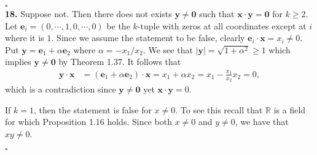 \documentclass[11pt]{article}
\begin{document}
\hfill$\square$\\

\noindent\textbf{18.} Suppose not.
Then there does not exists $\mathbf{y \neq 0}$ such that $\mathbf{x \cdot y = 0}$ for $k \geq 2$.
Let $\mathbf{e}_{i} = (0, \cdots, 1, 0, \cdots, 0)$ be the $k$-tuple with zeros at all coordinates except at $i$ where it is $1$.
Since we assume the statement to be false, clearly $\mathbf{e}_{i} \cdot \mathbf{x} = x_i \neq 0$.
Put $\mathbf{y} = \mathbf{e}_{1} + \alpha \mathbf{e}_{2}$ where $\alpha = -x_1/x_2$. We see that $|\mathbf{y}| = \sqrt{ 1 + \alpha^2 } \geq 1$ which implies $\mathbf{y \neq 0}$ by Theorem 1.37.
It follows that
\begin{align*}
  \mathbf{y \cdot x} & = ( \mathbf{e}_{1} + \alpha\mathbf{e}_{2} ) \cdot \mathbf{x} = x_1 + \alpha x_2 = x_1 - \frac{x_1}{x_2}x_2
                       = 0,
\end{align*}
which is a contradiction since $\mathbf{y \neq 0}$ yet $\mathbf{x \cdot y} = 0$.

If $k = 1$, then the statement is false for $x \neq 0$.
To see this recall that $\mathbb{R}$ is a field for which Proposition 1.16 holds.
Since both $x \neq 0$ and $y \neq 0$, we have that $xy \neq 0$.

\hfill$\square$\\
\end{document}
